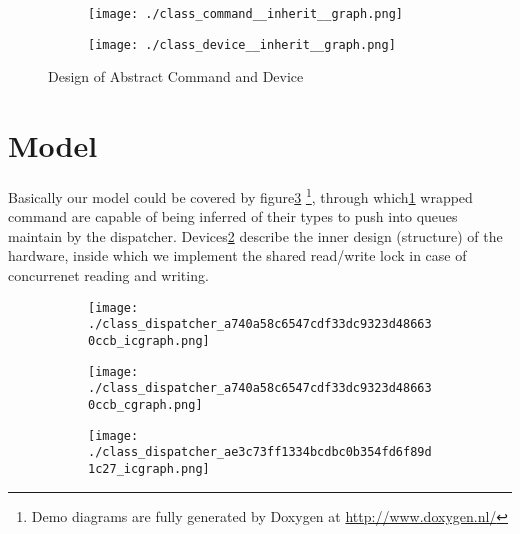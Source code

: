 \documentclass[a4paper]{article}
\begin{document}
\begin{figure}[h]
    \centering
    \begin{subfigure}{.4\textwidth}
    \begin{center}
    \texttt{[image: ./class\_command\_\_inherit\_\_graph.png]}
    \end{center}
    \label{fig:command_inheritance}
    \end{subfigure}
    \centering
    \begin{subfigure}{.4\textwidth}
    \begin{center}
    \texttt{[image: ./class\_device\_\_inherit\_\_graph.png]}
    \end{center}
    \label{fig:device_inheritance}
    \end{subfigure}
    \caption{Design of Abstract Command and Device}%
    \label{fig:design_abstract}
\end{figure}

\section{Model}%
\label{sec:model}

Basically our model could be covered by figure\ref{fig:design_abstract}
\footnote{Demo diagrams are fully generated by Doxygen at \url{http://www.doxygen.nl/}}, through
which\ref{fig:command_inheritance}
wrapped command are capable of being inferred of their types to push into queues maintain
by the dispatcher. Devices\ref{fig:device_inheritance}
describe the inner design (structure) of the hardware,
inside which we implement the shared read/write lock in case of
concurrenet reading and writing.

\begin{figure}[h]
    \centering
    \begin{subfigure}{.3\textwidth}
    \begin{center}
    \texttt{[image: ./class\_dispatcher\_a740a58c6547cdf33dc9323d486630ccb\_icgraph.png]}
    \end{center}
    \label{fig:dispatch_in_main}
    \end{subfigure}
    \centering
    \begin{subfigure}{.3\textwidth}
    \begin{center}
    \texttt{[image: ./class\_dispatcher\_a740a58c6547cdf33dc9323d486630ccb\_cgraph.png]}
    \end{center}
    \label{fig:dispatcher_start}
    \end{subfigure}
    \centering
    \begin{subfigure}{.3\textwidth}
    \begin{center}
    \texttt{[image: ./class\_dispatcher\_ae3c73ff1334bcdbc0b354fd6f89d1c27\_icgraph.png]}
    \end{center}
    \label{fig:dispatcher_terminate}
    \end{subfigure}

\end{figure}
\end{document}
